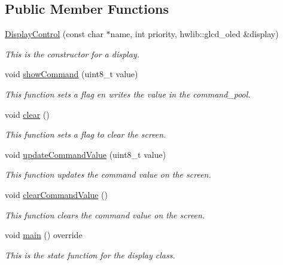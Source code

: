 \subsection*{Public Member Functions}
\begin{DoxyCompactItemize}
\item 
\mbox{\hyperlink{class_display_control_a5a24ccc28d6984bda6871ef6d0e4af3f}{Display\+Control}} (const char $\ast$name, int priority, hwlib\+::glcd\+\_\+oled \&display)
\begin{DoxyCompactList}\small\item\em This is the constructor for a display. \end{DoxyCompactList}\item 
\mbox{\label{class_display_control_a78b3ace358fc199a76e00148115f449d}} 
void \mbox{\hyperlink{class_display_control_a78b3ace358fc199a76e00148115f449d}{show\+Command}} (uint8\+\_\+t value)
\begin{DoxyCompactList}\small\item\em This function sets a flag en writes the value in the command\+\_\+pool. \end{DoxyCompactList}\item 
\mbox{\label{class_display_control_aa231d63d18b09506e0c766999f480579}} 
void \mbox{\hyperlink{class_display_control_aa231d63d18b09506e0c766999f480579}{clear}} ()
\begin{DoxyCompactList}\small\item\em This function sets a flag to clear the screen. \end{DoxyCompactList}\item 
void \mbox{\hyperlink{class_display_control_ae2d8d0f502941d859639fd46ddd8924b}{update\+Command\+Value}} (uint8\+\_\+t value)
\begin{DoxyCompactList}\small\item\em This function updates the command value on the screen. \end{DoxyCompactList}\item 
\mbox{\label{class_display_control_a01207b2034dc3946856496bf2e4d39b6}} 
void \mbox{\hyperlink{class_display_control_a01207b2034dc3946856496bf2e4d39b6}{clear\+Command\+Value}} ()
\begin{DoxyCompactList}\small\item\em This function clears the command value on the screen. \end{DoxyCompactList}\item 
void \mbox{\hyperlink{class_display_control_a9707c32249e0a648afc2def818900f30}{main}} () override
\begin{DoxyCompactList}\small\item\em This is the state function for the display class. \end{DoxyCompactList}\end{DoxyCompactItemize}


